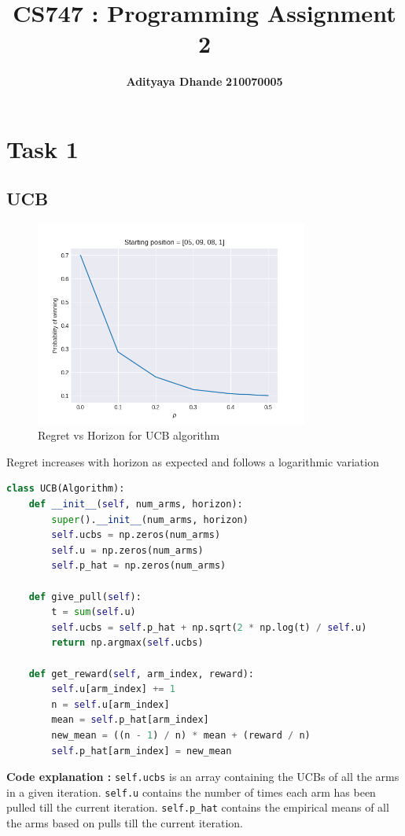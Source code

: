 \documentclass[11pt]{article}
\title{\textbf{CS747 : Programming Assignment 2}}
\author{\textbf{Adityaya Dhande}   \hspace{8mm} \textbf{210070005}}
\begin{document}
\maketitle
\section*{Task 1}

\subsection*{UCB}

\begin{figure}[H]
    \begin{center}
        \includegraphics[width=0.8\textwidth]{../images/plot1.png}
        
        \caption{Regret vs Horizon for UCB algorithm}
    \end{center}
 \end{figure}
 Regret increases with horizon as expected and follows a logarithmic variation
 \begin{lstlisting}[language=Python]      
    class UCB(Algorithm):
    def __init__(self, num_arms, horizon):
        super().__init__(num_arms, horizon)
        self.ucbs = np.zeros(num_arms)
        self.u = np.zeros(num_arms)
        self.p_hat = np.zeros(num_arms)
    
    def give_pull(self):
        t = sum(self.u)
        self.ucbs = self.p_hat + np.sqrt(2 * np.log(t) / self.u)
        return np.argmax(self.ucbs)
    
    def get_reward(self, arm_index, reward):
        self.u[arm_index] += 1
        n = self.u[arm_index]
        mean = self.p_hat[arm_index]
        new_mean = ((n - 1) / n) * mean + (reward / n)
        self.p_hat[arm_index] = new_mean\end{lstlisting}
    \textbf{Code explanation :} \texttt{self.ucbs} is an array containing
    the UCBs of all the arms in a given iteration. \texttt{self.u} contains
    the number of times each arm has been pulled till the current iteration. 
    \texttt{self.p\_hat} contains the empirical means of all the arms
    based on pulls till the current iteration. 
    
\end{document}

